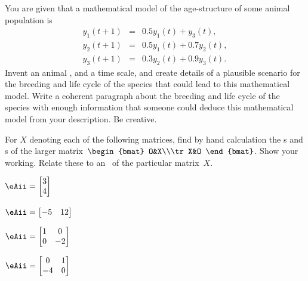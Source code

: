 \begin{exercise}  
You are given that a mathematical model of the age-structure of some animal population is
\begin{eqnarray*}
y_1(t+1)&=& 0.5y_1(t)+y_3(t),\\
y_2(t+1)&=& 0.5y_1(t)+0.7y_2(t),\\
y_3(t+1)&=& 0.3y_2(t)+0.9y_3(t).
\end{eqnarray*}
Invent an animal , and a time scale, and create details of a plausible scenario for the breeding and life cycle of the species that could lead to this mathematical model.  
Write a coherent paragraph about the breeding and life cycle of the species with enough information that someone could deduce this mathematical model from your description.  
Be creative.
\end{exercise}











\begin{exercise}  
For \(X\) denoting each of the following matrices, find by hand calculation the s and s of the larger matrix~\(\begin{bmat} O&X\\\tr X&O \end{bmat}\).
Show your working.
Relate these to an \svd\ of the particular matrix~\(X\).
\begin{Parts}
\item \(\eAii=\begin{bmatrix} 3\\4 \end{bmatrix}\)

\item \(\eAii=\begin{bmatrix} -5&12 \end{bmatrix}\)

\item \(\eAii=\begin{bmatrix} 1&0\\0&-2 \end{bmatrix}\)

\item \(\eAii=\begin{bmatrix} 0&1\\-4&0 \end{bmatrix}\)

\end{Parts}
\end{exercise}





